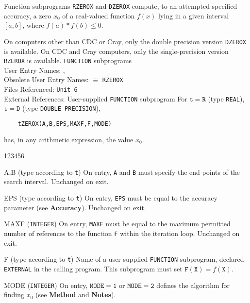                                 
                         
\Submitter{ }                                  
                             
Function subprograms {\tt RZEROX} and {\tt DZEROX} compute, to an
attempted  specified accuracy, a zero $ x_0 $ of a real-valued
function $f(x)$ lying in a given interval $[a,b]$,
where $f(a)*f(b)\le 0 $.
\par
On computers other than  CDC or Cray, only the double precision
version {\tt DZEROX} is  available.
On CDC and Cray computers, only the single-precision version
{\tt RZEROX} is available.
\Structure
{\tt FUNCTION} subprograms \\
User Entry Names: ,  \\
Obsolete User Entry Names:  $\equiv$ {\tt RZEROX} \\
Files Referenced:  {\tt Unit 6} \\
External References: User-supplied {\tt FUNCTION} subprogram
\Usage
For $\mathtt{t=R}$ (type {\tt REAL}), $\mathtt{t=D}$ (type
{\tt DOUBLE PRECISION}),
\begin{verbatim}
    tZEROX(A,B,EPS,MAXF,F,MODE)
\end{verbatim}
has, in any arithmetic expression, the value $x_0$.
\begin{DLtt}{123456}
\item[A,B] (type according to {\tt t}) On entry, {\tt A} and {\tt B}
must specify the end points of the search interval. Unchanged on exit.
\item[EPS] (type according to {\tt t})
On entry, {\tt EPS} must be equal  to the accuracy  parameter
(see {\bf Accuracy}). Unchanged   on  exit.
\item[MAXF] ({\tt INTEGER})
On entry, {\tt MAXF} must be equal to the maximum  permitted
number of references  to the function {\tt F} within the iteration loop.
Unchanged on exit.
\item[F] (type according to {\tt t}) Name of a user-supplied
{\tt FUNCTION} subprogram, declared {\tt EXTERNAL} in the calling
program. This subprogram  must set $\mathtt{F(X)} = f(\mathtt{X})$.
\item[MODE] ({\tt INTEGER})
On entry, $\mathtt{MODE=1}$ or $\mathtt{MODE=2}$ defines the
algorithm for finding $x_0$ (see {\bf Method} and {\bf Notes}).
\end{DLtt}

